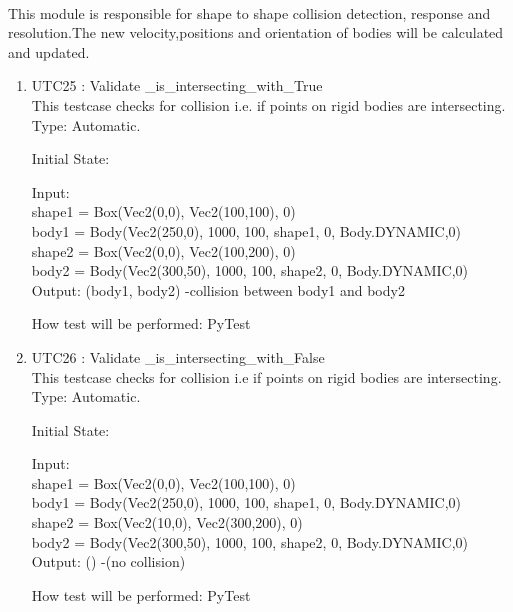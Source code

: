 \documentclass[12pt, titlepage]{article}
\begin{document}
\paragraph{}
This module is responsible for shape to shape collision detection, response and resolution.The new velocity,positions and orientation of bodies will be calculated and updated.
\begin{enumerate}
	
	
	\item{UTC25} {: Validate \_is\_intersecting\_with\_True \\}
This testcase checks for collision i.e. if points on rigid bodies are intersecting.\\	
	Type: Automatic.
	
	Initial State: 
	
	Input: \\
	shape1 = Box(Vec2(0,0), Vec2(100,100), 0)\\
	body1 = Body(Vec2(250,0), 1000, 100, shape1, 0, Body.DYNAMIC,0)\\
	
	shape2 = Box(Vec2(0,0), Vec2(100,200), 0)\\
	body2 = Body(Vec2(300,50), 1000, 100, shape2, 0, Body.DYNAMIC,0)\\
	
	Output: (body1, body2) -collision between body1 and body2
	
	How test will be performed: PyTest 
	
	\item{UTC26} {: Validate \_is\_intersecting\_with\_False \\}
	This testcase checks for collision i.e if points on rigid bodies are intersecting.\\	
	Type: Automatic.
	
	Initial State: 
	
	Input: \\
	shape1 = Box(Vec2(0,0), Vec2(100,100), 0)\\
	body1 =  Body(Vec2(250,0), 1000, 100, shape1, 0, Body.DYNAMIC,0)\\
	
	shape2 = Box(Vec2(10,0), Vec2(300,200), 0)\\
	body2 = Body(Vec2(300,50), 1000, 100, shape2, 0, Body.DYNAMIC,0)\\
	
	Output: () -(no collision)
	
	How test will be performed: PyTest 
	
	


\end{enumerate}
\end{document}

